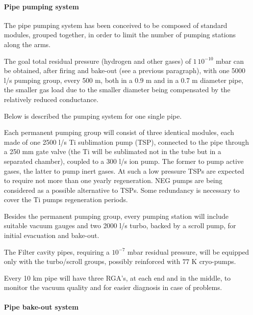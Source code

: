 \paragraph{Pipe pumping system}

The pipe pumping system has been conceived to be composed of standard modules, grouped together, in order to limit the number of pumping stations along the arms.

The goal total residual pressure (hydrogen and other gases) of $1\,10^{-10}$ mbar can be obtained, after firing and bake-out (see a previous paragraph), with one 5000 l/s pumping group, every 500 m, both in a 0.9 m and in a 0.7 m diameter  pipe, the smaller gas load due to the smaller diameter being compensated by the relatively reduced conductance.

Below is described the pumping system for one single pipe. 

Each permanent pumping group will consist of three identical modules, each made of one 2500 l/s Ti sublimation pump (TSP), connected to the pipe through a 250 mm gate valve (the Ti will be sublimated not in the tube but in a separated chamber), coupled to a 300 l/s ion pump. The former to pump active gases, the latter to pump inert gases. At such a low pressure TSPs are expected to require not more than one yearly regeneration. NEG pumps are being considered as a possible alternative to TSPs. Some redundancy is necessary to cover the Ti pumps regeneration periods.

Besides the permanent pumping group, every pumping station will include suitable vacuum gauges and two 2000 l/s turbo, backed by a scroll pump, for initial evacuation and bake-out.

The Filter cavity pipes, requiring a $10^{-7}$ mbar residual pressure, will be equipped only with the turbo/scroll groups, possibly reinforced with $77$ K cryo-pumps.

Every 10 km pipe will have three RGA's, at each end and in the middle, to monitor the vacuum quality and for easier diagnosis in case of problems.

\paragraph{Pipe bake-out system}

